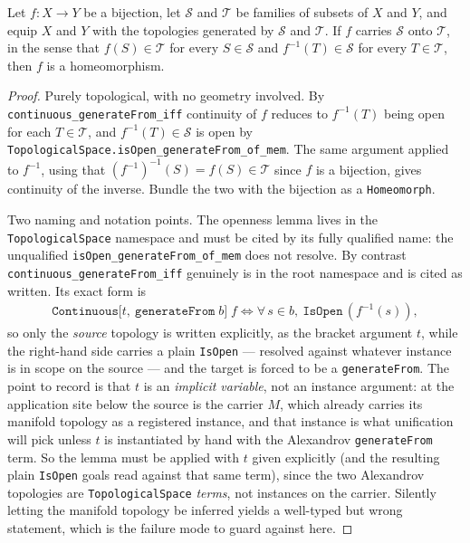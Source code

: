 \begin{lemma}
    \label{lmm:bijection-generated-topology-homeomorphism}
    Let $f : X \to Y$ be a bijection, let $\mathcal{S}$ and $\mathcal{T}$ be families of subsets of $X$ and $Y$, and equip $X$ and $Y$ with the topologies generated by $\mathcal{S}$ and $\mathcal{T}$. If $f$ carries $\mathcal{S}$ onto $\mathcal{T}$, in the sense that $f(S) \in \mathcal{T}$ for every $S \in \mathcal{S}$ and $f^{-1}(T) \in \mathcal{S}$ for every $T \in \mathcal{T}$, then $f$ is a homeomorphism.
\end{lemma}
\begin{proof}
    Purely topological, with no geometry involved. By \texttt{continuous\_generateFrom\_iff} continuity of $f$ reduces to $f^{-1}(T)$ being open for each $T \in \mathcal{T}$, and $f^{-1}(T) \in \mathcal{S}$ is open by \texttt{TopologicalSpace.isOpen\_generateFrom\_of\_mem}. The same argument applied to $f^{-1}$, using that $(f^{-1})^{-1}(S) = f(S) \in \mathcal{T}$ since $f$ is a bijection, gives continuity of the inverse. Bundle the two with the bijection as a \texttt{Homeomorph}.

    Two naming and notation points. The openness lemma lives in the \texttt{TopologicalSpace} namespace and must be cited by its fully qualified name: the unqualified \texttt{isOpen\_generateFrom\_of\_mem} does not resolve. By contrast \texttt{continuous\_generateFrom\_iff} genuinely is in the root namespace and is cited as written. Its exact form is
    \begin{align}
        \mathtt{Continuous[}t,\ \mathtt{generateFrom}\;b\mathtt{]}\;f \iff \forall\,s \in b,\ \mathtt{IsOpen}\,(f^{-1}(s)),
    \end{align}
    so only the \emph{source} topology is written explicitly, as the bracket argument $t$, while the right-hand side carries a plain \texttt{IsOpen} --- resolved against whatever instance is in scope on the source --- and the target is forced to be a \texttt{generateFrom}. The point to record is that $t$ is an \emph{implicit variable}, not an instance argument: at the application site below the source is the carrier $M$, which already carries its manifold topology as a registered instance, and that instance is what unification will pick unless $t$ is instantiated by hand with the Alexandrov \texttt{generateFrom} term. So the lemma must be applied with $t$ given explicitly (and the resulting plain \texttt{IsOpen} goals read against that same term), since the two Alexandrov topologies are \texttt{TopologicalSpace} \emph{terms}, not instances on the carrier. Silently letting the manifold topology be inferred yields a well-typed but wrong statement, which is the failure mode to guard against here.
\end{proof}

